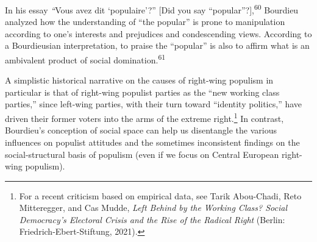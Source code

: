 \documentclass{tufte-handout}
\begin{document}
In his essay \emph{``}Vous avez dit `populaire'?'' {[}Did you say
``popular''?{]},\textsuperscript{60} Bourdieu analyzed how the understanding of ``the
popular'' is prone to manipulation according to one's interests and
prejudices and condescending views. According to a Bourdieusian
interpretation, to praise the ``popular'' is also to affirm what is an
ambivalent product of social domination.\textsuperscript{61}

A simplistic historical narrative on the causes of right-wing populism
in particular is that of right-wing populist parties as the ``new
working class parties,'' since left-wing parties, with their turn toward
``identity politics,'' have driven their former voters into the arms of
the extreme right.\footnote{For a recent criticism based on empirical
  data, see Tarik Abou-Chadi, Reto Mitteregger, and Cas Mudde,
  \emph{Left Behind by the Working Class? Social Democracy's Electoral
  Crisis and the Rise of the Radical Right} (Berlin:
  Friedrich-Ebert-Stiftung, 2021).\vspace{.1in}} In contrast, Bourdieu's conception
of social space can help us disentangle the various influences on
populist attitudes and the sometimes inconsistent findings on the
social-structural basis of populism (even if we focus on Central
European right-wing populism).
\end{document}
